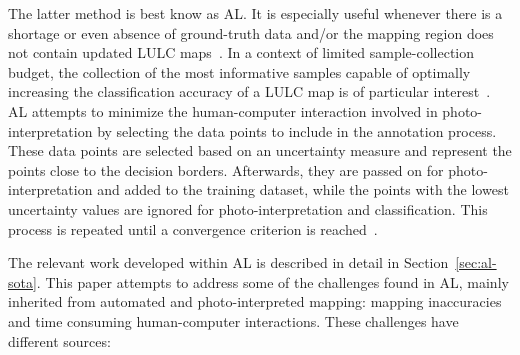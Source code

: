 \documentclass[preprint,12pt]{elsarticle}
\begin{document}
The latter method is best know as AL\@. It is especially useful whenever there
is a shortage or even absence of ground-truth data and/or the mapping region
does not contain updated LULC maps~\cite{Su2020}. In a context of limited
sample-collection budget, the collection of the most informative samples
capable of optimally increasing the classification accuracy of a LULC map is
of particular interest~\cite{Su2020}. AL attempts to minimize the
human-computer interaction involved in photo-interpretation by selecting the
data points to include in the annotation process. These data points are
selected based on an uncertainty measure and represent the points close to the
decision borders. Afterwards, they are passed on for photo-interpretation and
added to the training dataset, while the points with the lowest uncertainty
values are ignored for photo-interpretation and classification. This process
is repeated until a convergence criterion is reached~\cite{Pasolli2016}. 

The relevant work developed within AL is described in detail in
Section~\ref{sec:al-sota}. This paper attempts to address some of the
challenges found in AL, mainly inherited from automated and photo-interpreted
mapping: mapping inaccuracies and time consuming human-computer interactions.
These challenges have different sources:
\end{document}
